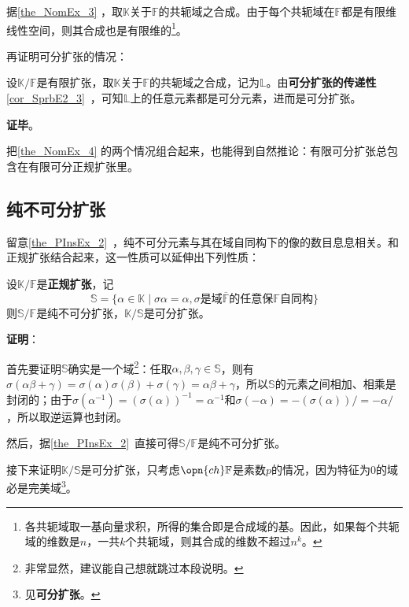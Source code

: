 据\autoref{the_NomEx_3} ，取$\mathbb{K}$关于$\mathbb{F}$的共轭域之合成。由于每个共轭域在$\mathbb{F}$都是有限维线性空间，则其合成也是有限维的\footnote{各共轭域取一基向量求积，所得的集合即是合成域的基。因此，如果每个共轭域的维数是$n$，一共$k$个共轭域，则其合成的维数不超过$n^k$。}。

再证明可分扩张的情况：

设$\mathbb{K}/\mathbb{F}$是有限扩张，取$\mathbb{K}$关于$\mathbb{F}$的共轭域之合成，记为$\mathbb{L}$。由\textbf{可分扩张的传递性}\autoref{cor_SprbE2_3}~，可知$\mathbb{L}$上的任意元素都是可分元素，进而是可分扩张。

\textbf{证毕}。

把\autoref{the_NomEx_4} 的两个情况组合起来，也能得到自然推论：有限可分扩张总包含在有限可分正规扩张里。


\subsection{纯不可分扩张}



留意\autoref{the_PInsEx_2}~，纯不可分元素与其在域自同构下的像的数目息息相关。和正规扩张结合起来，这一性质可以延伸出下列性质：

\begin{theorem}{}\label{the_NomEx_5}
设$\mathbb{K}/\mathbb{F}$是\textbf{正规扩张}，记
\begin{equation}\label{eq_NomEx_1}
\mathbb{S}=\{\alpha\in\mathbb{K}\mid \sigma\alpha = \alpha, \sigma\text{是域}\overline{\mathbb{F}}\text{的任意保}\mathbb{F}\text{自同构}\}
\end{equation}
则$\mathbb{S}/\mathbb{F}$是纯不可分扩张，$\mathbb{K}/\mathbb{S}$是可分扩张。
\end{theorem}

\textbf{证明}：

首先要证明$\mathbb{S}$确实是一个域\footnote{非常显然，建议能自己想就跳过本段说明。}：任取$\alpha, \beta, \gamma\in\mathbb{S}$，则有$\sigma(\alpha\beta+\gamma)=\sigma(\alpha)\sigma(\beta)+\sigma(\gamma)=\alpha\beta+\gamma$，所以$\mathbb{S}$的元素之间相加、相乘是封闭的；由于$\sigma(\alpha^{-1})=(\sigma(\alpha))^{-1}=\alpha^{-1}$和$\sigma(-\alpha)=-(\sigma(\alpha))/=-\alpha/$，所以取逆运算也封闭。

然后，据\autoref{the_PInsEx_2}~直接可得$\mathbb{S}/\mathbb{F}$是纯不可分扩张。

接下来证明$\mathbb{K}/\mathbb{S}$是可分扩张，只考虑$\opn{ch}\mathbb{F}$是素数$p$的情况，因为特征为$0$的域必是完美域\footnote{见\textbf{可分扩张}。}。


